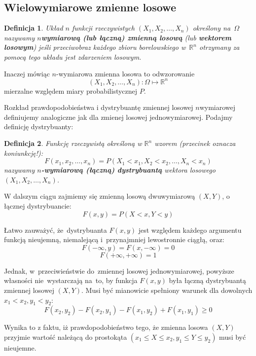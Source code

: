 \documentclass[10pt,a4paper]{article}
\newtheorem{definition}{Definicja}[section]
\numberwithin{equation}{subsection}
\begin{document}
\subsection{Wielowymiarowe zmienne losowe}

\begin{definition}
  Układ $n$ funkcji rzeczywistych $(X_1,X_2,\dotsc,X_n)$ określony na~$\Omega$
  nazywamy \textbf{$n$\dywiz wymiarową (lub łączną) zmienną losową}
  (lub \textbf{wektorem losowym}) jeśli przeciwobraz każdego zbioru
  borelowskiego w~$\mathbb{R}^n$ otrzymany za pomocą tego układu jest zdarzeniem
  losowym.
\end{definition}

Inaczej mówiąc $n$-wymiarowa zmienna losowa to odwzorowanie
\[
  (X_1,X_2,\dotsc,X_n):\Omega \mapsto \mathbb{R}^n
\]
mierzalne względem miary probabilistycznej $P$.

Rozkład prawdopodobieństwa i dystrybuantę zmiennej losowej $n$\dywiz wymiarowej definiujemy analogiczne jak dla zmienej losowej jednowymiarowej. Podajmy definicję
dystrybuanty:
\begin{definition}
  Funkcję rzeczywistą  określoną w $\mathbb{R}^n$ wzorem (przecinek oznacza
  koniunkcję!):
  \[
    F(x_1, x_2,\dotsc, x_n) = P(X_1 < x_1, X_2 < x_2,\dotsc, X_n < x_n)
  \]
  nazywamy \textbf{$n$-wymiarową (łączną) dystrybuantą} wektora
  losowego $(X_1,X_2,\dotsc,X_n)$.
\end{definition}

W dalszym ciągu zajmiemy się zmienną losową dwuwymiarową $(X,Y)$, o łącznej
dystrybuancie:
\[
  F(x,y) = P(X<x, Y<y)
\]

Łatwo zauważyć, że~dystrybuanta $F(x,y)$ jest względem każdego argumentu funkcją
nieujemną, niemalejącą i~przynajmniej lewostronnie ciągłą, oraz:
\[
  F(-\infty, y) = F(x, -\infty) = 0
\]
\[
  F(+\infty, +\infty) = 1
\]

Jednak, w~przeciwieństwie do~zmiennej losowej jednowymiarowej, powyższe własności
nie~wystarczają na~to, by funkcja $F(x,y)$ była łączną dystrybuantą zmiennej
losowej $(X,Y)$. Musi być mianowicie spełniony warunek dla dowolnych
$x_1 < x_2, y_1 < y_2$:
\begin{equation}
  F(x_2,y_2)-F(x_2, y_1) - F(x_1, y_2) + F(x_1, y_1) \geq 0
\end{equation}

Wynika to z faktu, iż prawdopodobieństwo tego, że zmienna losowa $(X,Y)$
przyjmie wartość należącą do prostokąta $(x_1\leq X\leq x_2, y_1\leq Y\leq y_2)$
musi być nieujemne.
\end{document}
